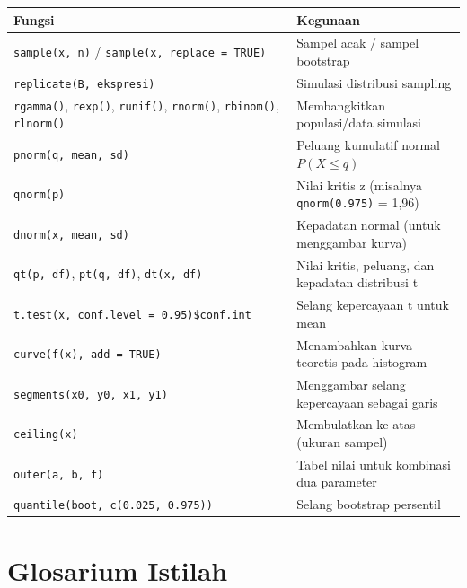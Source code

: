 \documentclass[
  indonesian,
  letterpaper,
]{book}
\newcounter{none} %
\begin{document}
{\def\LTcaptype{none} %
\begin{longtable}[]{@{}
  >{\raggedright\arraybackslash}p{}
  >{\raggedright\arraybackslash}p{}@{}}
\toprule\noalign{}
\begin{minipage}[b]{\linewidth}\raggedright
Fungsi
\end{minipage} & \begin{minipage}[b]{\linewidth}\raggedright
Kegunaan
\end{minipage} \\
\midrule\noalign{}
\endhead
\bottomrule\noalign{}
\endlastfoot
\texttt{sample(x,\ n)} / \texttt{sample(x,\ replace\ =\ TRUE)} & Sampel
acak / sampel bootstrap \\
\texttt{replicate(B,\ ekspresi)} & Simulasi distribusi sampling \\
\texttt{rgamma()}, \texttt{rexp()}, \texttt{runif()}, \texttt{rnorm()},
\texttt{rbinom()}, \texttt{rlnorm()} & Membangkitkan populasi/data
simulasi \\
\texttt{pnorm(q,\ mean,\ sd)} & Peluang kumulatif normal
\(P(X \leq q)\) \\
\texttt{qnorm(p)} & Nilai kritis z (misalnya \texttt{qnorm(0.975)} =
1,96) \\
\texttt{dnorm(x,\ mean,\ sd)} & Kepadatan normal (untuk menggambar
kurva) \\
\texttt{qt(p,\ df)}, \texttt{pt(q,\ df)}, \texttt{dt(x,\ df)} & Nilai
kritis, peluang, dan kepadatan distribusi t \\
\texttt{t.test(x,\ conf.level\ =\ 0.95)\$conf.int} & Selang kepercayaan
t untuk mean \\
\texttt{curve(f(x),\ add\ =\ TRUE)} & Menambahkan kurva teoretis pada
histogram \\
\texttt{segments(x0,\ y0,\ x1,\ y1)} & Menggambar selang kepercayaan
sebagai garis \\
\texttt{ceiling(x)} & Membulatkan ke atas (ukuran sampel) \\
\texttt{outer(a,\ b,\ f)} & Tabel nilai untuk kombinasi dua parameter \\
\texttt{quantile(boot,\ c(0.025,\ 0.975))} & Selang bootstrap
persentil \\
\end{longtable}
}

\section{Glosarium Istilah}\label{glosarium-istilah}
\end{document}
